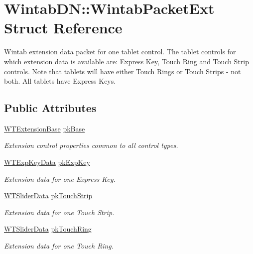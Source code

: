 \hypertarget{struct_wintab_d_n_1_1_wintab_packet_ext}{
\section{WintabDN::WintabPacketExt Struct Reference}
\label{struct_wintab_d_n_1_1_wintab_packet_ext}
}


Wintab extension data packet for one tablet control. The tablet controls for which extension data is available are: Express Key, Touch Ring and Touch Strip controls. Note that tablets will have either Touch Rings or Touch Strips -\/ not both. All tablets have Express Keys.  


\subsection*{Public Attributes}
\begin{DoxyCompactItemize}
\item 
\hyperlink{struct_wintab_d_n_1_1_w_t_extension_base}{WTExtensionBase} \hyperlink{struct_wintab_d_n_1_1_wintab_packet_ext_a8994260741db2010095537bd4326e9aa}{pkBase}
\begin{DoxyCompactList}\small\item\em Extension control properties common to all control types. \item\end{DoxyCompactList}\item 
\hyperlink{struct_wintab_d_n_1_1_w_t_exp_key_data}{WTExpKeyData} \hyperlink{struct_wintab_d_n_1_1_wintab_packet_ext_aedaaaf53b6fec81efc083188010e2a9b}{pkExpKey}
\begin{DoxyCompactList}\small\item\em Extension data for one Express Key. \item\end{DoxyCompactList}\item 
\hyperlink{struct_wintab_d_n_1_1_w_t_slider_data}{WTSliderData} \hyperlink{struct_wintab_d_n_1_1_wintab_packet_ext_a55c86bdd1cd442ecba1b61ccc1d4dfe8}{pkTouchStrip}
\begin{DoxyCompactList}\small\item\em Extension data for one Touch Strip. \item\end{DoxyCompactList}\item 
\hyperlink{struct_wintab_d_n_1_1_w_t_slider_data}{WTSliderData} \hyperlink{struct_wintab_d_n_1_1_wintab_packet_ext_ad0e35127b3d018e8e430644b086a0e68}{pkTouchRing}
\begin{DoxyCompactList}\small\item\em Extension data for one Touch Ring. \item\end{DoxyCompactList}\end{DoxyCompactItemize}


